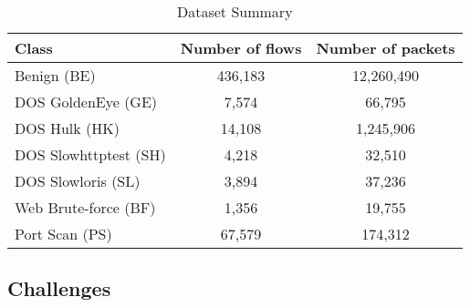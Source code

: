 \begin{table}[t]
    \centering
    \caption{Dataset Summary}
    \begin{tabular}{|l|c|c|}
    \hline
       Class  & Number of flows & Number of packets \\
    \hline
      Benign (BE)           & 436,183 & 12,260,490\\
      DOS GoldenEye (GE)    & 7,574 & 66,795 \\
      DOS Hulk (HK)         & 14,108 & 1,245,906\\
      DOS Slowhttptest (SH) & 4,218 & 32,510 \\
      DOS Slowloris (SL)    & 3,894 & 37,236\\
      Web Brute-force (BF)  & 1,356 & 19,755\\
      Port Scan (PS)        & 67,579 & 174,312\\
    \hline
    \end{tabular}
    \label{tab:datasummary}
\end{table}

\subsection{Challenges}\label{sub:challenges}

